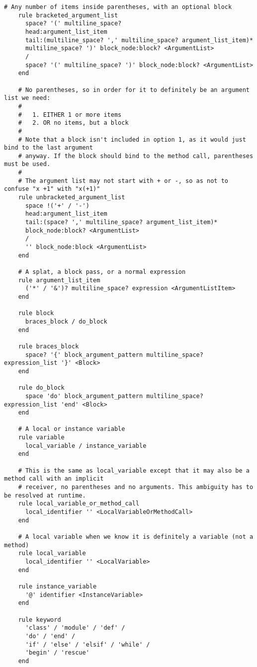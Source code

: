 \begin{lstlisting}[title={\small\Helvetica parser/language.treetop},language=treetop]
    # Any number of items inside parentheses, with an optional block
    rule bracketed_argument_list
      space? '(' multiline_space?
      head:argument_list_item
      tail:(multiline_space? ',' multiline_space? argument_list_item)*
      multiline_space? ')' block_node:block? <ArgumentList>
      /
      space? '(' multiline_space? ')' block_node:block? <ArgumentList>
    end
    
    # No parentheses, so in order for it to definitely be an argument list we need:
    #
    #   1. EITHER 1 or more items
    #   2. OR no items, but a block
    #
    # Note that a block isn't included in option 1, as it would just bind to the last argument
    # anyway. If the block should bind to the method call, parentheses must be used.
    # 
    # The argument list may not start with + or -, so as not to confuse "x +1" with "x(+1)"
    rule unbracketed_argument_list
      space !('+' / '-')
      head:argument_list_item
      tail:(space? ',' multiline_space? argument_list_item)*
      block_node:block? <ArgumentList>
      /
      '' block_node:block <ArgumentList>
    end
    
    # A splat, a block pass, or a normal expression
    rule argument_list_item
      ('*' / '&')? multiline_space? expression <ArgumentListItem>
    end
    
    rule block
      braces_block / do_block
    end
    
    rule braces_block
      space? '{' block_argument_pattern multiline_space? expression_list '}' <Block>
    end
    
    rule do_block
      space 'do' block_argument_pattern multiline_space? expression_list 'end' <Block>
    end
    
    # A local or instance variable
    rule variable
      local_variable / instance_variable
    end
    
    # This is the same as local_variable except that it may also be a method call with an implicit
    # receiver, no parentheses and no arguments. This ambiguity has to be resolved at runtime.
    rule local_variable_or_method_call
      local_identifier '' <LocalVariableOrMethodCall>
    end
    
    # A local variable when we know it is definitely a variable (not a method)
    rule local_variable
      local_identifier '' <LocalVariable>
    end
    
    rule instance_variable
      '@' identifier <InstanceVariable>
    end
    
    rule keyword
      'class' / 'module' / 'def' /
      'do' / 'end' /
      'if' / 'else' / 'elsif' / 'while' /
      'begin' / 'rescue'
    end
    

\end{lstlisting}
